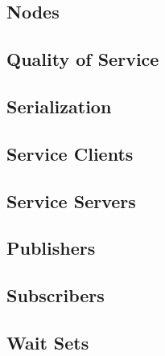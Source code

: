         

    \subsection{Nodes}

        

    \subsection{Quality of Service}

        

    \subsection{Serialization}

        

    \subsection{Service Clients}

        

    \subsection{Service Servers}

        

    \subsection{Publishers}

        

    \subsection{Subscribers}

        

        

    \subsection{Wait Sets}

        